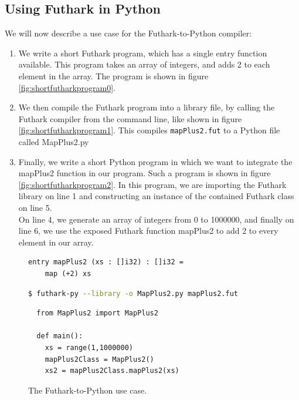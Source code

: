 \subsection*{Using Futhark in Python}
We will now describe a use case for the Futhark-to-Python compiler:
\begin{enumerate}
\item We write a short Futhark program, which has a single entry function
  available. This program takes an array of integers, and
adds 2 to each element in the array. The program is shown in figure \ref{fig:shortfutharkprogram0}. 
\item We then compile the Futhark program into a library file, by calling the
  Futhark compiler from the command line, like shown in figure \ref{fig:shortfutharkprogram1}.
This compiles \texttt{mapPlus2.fut} to a Python file called MapPlus2.py

\item Finally, we write a short Python program in which we want to integrate
  the mapPlus2 function in our program. Such a program is shown in figure \ref{fig:shortfutharkprogram2}.
  In this program, we are importing the Futhark library on line 1 and constructing
  an instance of the contained Futhark class on line 5.\\
  On line 4, we generate an array of integers from 0 to 1000000, and finally
  on line 6, we use the exposed Futhark function mapPlus2 to add 2 to every
  element in our array.
\end{enumerate}

\begin{figure}[H]
    \centering
    \begin{subfigure}
    \begin{lstlisting}[language=Futhark]
  entry mapPlus2 (xs : []i32) : []i32 =
    map (+2) xs
    \end{lstlisting}
    \caption{A short Futhark program called mapPlus2.fut}
    \label{fig:shortfutharkprogram0}
  \end{subfigure}

  \begin{subfigure}
\begin{lstlisting}[language=bash]
  $ futhark-py --library -o MapPlus2.py mapPlus2.fut
    \end{lstlisting}
    \caption{We call the Futhark-to-Python compiler \texttt{futhark-py} on
      mapPlus2.fut}
    \label{fig:shortfutharkprogram1}
  \end{subfigure}
  
  \begin{subfigure}
\begin{verbatim}
  from MapPlus2 import MapPlus2

  def main():
    xs = range(1,1000000)
    mapPlus2Class = MapPlus2()
    xs2 = mapPlus2Class.mapPlus2(xs)
  \end{verbatim}
    \caption{We use the compiled Futhark program as any other library.}
    \label{fig:shortfutharkprogram2}
  \end{subfigure}
  \caption{The Futhark-to-Python use case.}
  \label{fig:shortfutharkprogram}
\end{figure}
\clearpage

